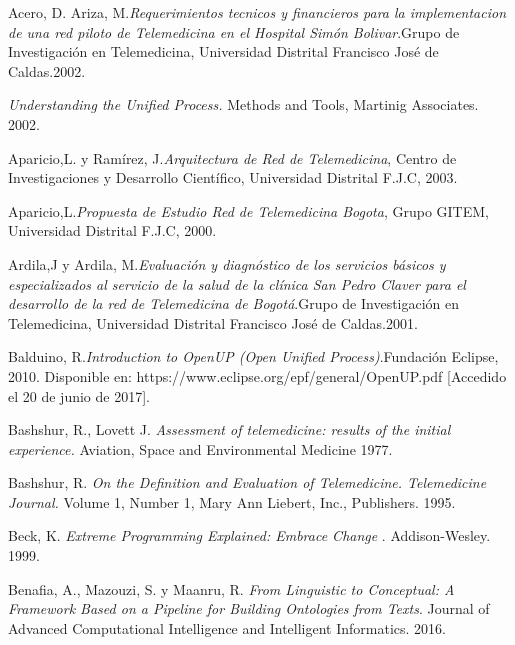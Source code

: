 \begin{thebibliography}{}

 Acero, D. Ariza, M.\textit{Requerimientos tecnicos y financieros para la implementacion de una red piloto de Telemedicina en el Hospital Simón Bolivar}.Grupo de Investigación en Telemedicina,  Universidad Distrital Francisco José de Caldas.2002.

 \textit{Understanding the Unified Process.} Methods and Tools, Martinig Associates. 2002.

 Aparicio,L. y Ramírez, J.\textit{Arquitectura de Red de Telemedicina}, Centro de Investigaciones y Desarrollo Científico, Universidad Distrital F.J.C, 2003.

 Aparicio,L.\textit{Propuesta de Estudio Red de Telemedicina Bogota}, Grupo GITEM, Universidad Distrital F.J.C, 2000.

 Ardila,J y Ardila, M.\textit{Evaluación y diagnóstico de los servicios básicos y especializados al servicio de la salud de la clínica San Pedro Claver para el desarrollo de la red de Telemedicina de Bogotá}.Grupo de Investigación en Telemedicina,  Universidad Distrital Francisco José de Caldas.2001.

 Balduino, R.\textit{Introduction to OpenUP (Open Unified Process)}.Fundación Eclipse, 2010. Disponible en: https://www.eclipse.org/epf/general/OpenUP.pdf [Accedido el 20 de junio de 2017].

 Bashshur, R., Lovett J. \textit{Assessment of telemedicine: results of the initial experience.} Aviation, Space and Environmental Medicine 1977.

 Bashshur, R. \textit{On the Definition and Evaluation of Telemedicine. Telemedicine Journal.} Volume 1, Number 1, Mary Ann Liebert, Inc., Publishers. 1995.

 Beck, K. \textit{ Extreme Programming Explained: Embrace Change }. Addison-Wesley. 1999.

 Benafia, A., Mazouzi, S. y Maanru, R. \textit{From Linguistic to Conceptual: A Framework Based on a Pipeline for Building Ontologies from Texts}. Journal of Advanced Computational Intelligence and Intelligent Informatics. 2016.


\end{thebibliography}
